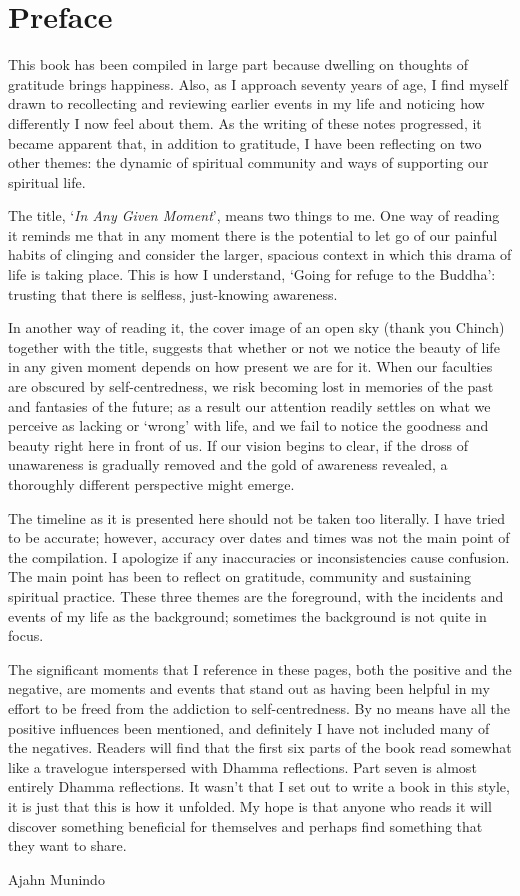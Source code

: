 \chapter{Preface}

This book has been compiled in large part because dwelling on thoughts
of gratitude brings happiness. Also, as I approach seventy years of age,
I find myself drawn to recollecting and reviewing earlier events in my
life and noticing how differently I now feel about them. As the writing
of these notes progressed, it became apparent that, in addition to
gratitude, I have been reflecting on two other themes: the dynamic of
spiritual community and ways of supporting our spiritual life.

The title, `\emph{In Any Given Moment}', means two things to me. One way
of reading it reminds me that in any moment there is the potential to
let go of our painful habits of clinging and consider the larger,
spacious context in which this drama of life is taking place. This is
how I understand, `Going for refuge to the Buddha': trusting that there
is selfless, just-knowing awareness.

\enlargethispage{\baselineskip}

In another way of reading it, the cover image of an open sky (thank you
Chinch) together with the title, suggests that whether or not we notice
the beauty of life in any given moment depends on how present we are for
it. When our faculties are obscured by self-centredness, we risk
becoming lost in memories of the past and fantasies of the future; as a
result our attention readily settles on what we perceive as lacking or
`wrong' with life, and we fail to notice the goodness and beauty right
here in front of us. If our vision begins to clear, if the dross of
unawareness is gradually removed and the gold of awareness revealed, a
thoroughly different perspective might emerge.

The timeline as it is presented here should not be taken too literally.
I have tried to be accurate; however, accuracy over dates and times was
not the main point of the compilation. I apologize if any inaccuracies
or inconsistencies cause confusion. The main point has been to reflect
on gratitude, community and sustaining spiritual practice. These three
themes are the foreground, with the incidents and events of my life as
the background; sometimes the background is not quite in focus.

The significant moments that I reference in these pages, both the
positive and the negative, are moments and events that stand out as
having been helpful in my effort to be freed from the addiction to
self-centredness. By no means have all the positive influences been
mentioned, and definitely I have not included many of the negatives.
Readers will find that the first six parts of the book read somewhat like a travelogue
interspersed with Dhamma reflections. Part seven is almost
entirely Dhamma reflections. It wasn't that I set out to write a book in
this style, it is just that this is how it unfolded. My hope is that
anyone who reads it will discover something beneficial for themselves
and perhaps find something that they want to share.

\bigskip

{\raggedleft
  Ajahn Munindo
\par}


